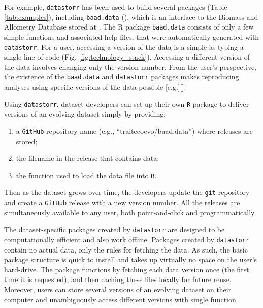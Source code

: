\documentclass[a4paper,num-refs]{assets/oup-contemporary}
\begin{document}
For example, \texttt{datastorr} has been used to build several packages (Table \ref{tab:examples}), including \texttt{baad.data} (), which is an interface to the Biomass and Allometry Database \cite{Falster-2015} stored at . The R package \texttt{baad.data} consists of only a few simple functions and associated help files, that were automatically generated with \texttt{datastorr}. For a user, accessing a version of the data is a simple as typing a single line of code (Fig. \ref{fig:technology_stack}). Accessing a different version of the data involves changing only the version number. From the user's perspective, the existence of the \texttt{baad.data} and \texttt{datastorr} packages makes reproducing analyses using specific versions of the data possible [e.g.][]\cite{Duursma-2016,Falster-2018}.


Using \texttt{datastorr}, dataset developers can set up their own \texttt{R} package to deliver versions of an evolving dataset simply by providing:
\begin{enumerate}
  \item a \texttt{GitHub} repository name (e.g., ``traitecoevo/baad.data'') where releases are stored;
  \item the filename in the release that contains data;
  \item the function used to load the data file into \texttt{R}.
\end{enumerate}

Then as the dataset grows over time, the developers update the \texttt{git} repository and create a \texttt{GitHub} release with a new version number. All the releases are simultaneously available to any user, both point-and-click and programmatically.

The dataset-specific packages created by \texttt{datastorr} are designed to be computationally efficient and also work offline. Packages created by \texttt{datastorr} contain no actual data, only the rules for fetching the data. As such, the basic package structure is quick to install and takes up virtually no space on the user's hard-drive. The package functions by fetching each data version once (the first time it is requested), and then caching these files locally for future reuse. Moreover, users can store several versions of an evolving dataset on their computer and unambiguously access different versions with single function.
\end{document}
